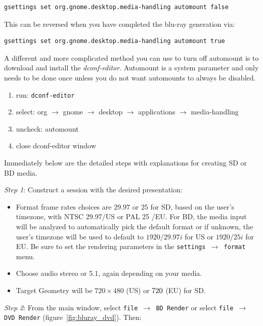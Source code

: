\begin{lstlisting}[language=bash,numbers=none]
gsettings set org.gnome.desktop.media-handling automount false
\end{lstlisting}

This can be reversed when you have completed the blu-ray generation via:

\begin{lstlisting}[language=bash,numbers=none]
gsettings set org.gnome.desktop.media-handling automount true
\end{lstlisting}

A different and more complicated method you can use to turn off automount is to download and install the \textit{dconf-editor}.  Automount is a system parameter and only needs to be done once unless you do not want automounts to always be disabled.

\begin{enumerate}
    \item run: \texttt{dconf-editor}
    \item select: org $\rightarrow$ gnome $\rightarrow$ desktop $\rightarrow$ applications $\rightarrow$ media-handling
    \item uncheck: automount
    \item close dconf-editor window
\end{enumerate}

Immediately below are the detailed steps with explanations for creating SD or BD media.

\textit{Step 1}: Construct a session with the desired presentation:

\begin{itemize}
    \item Format frame rates choices are $29.97$ or $25$ for SD, based on the user's timezone, with NTSC 29.97/US or PAL 25 /EU.  For BD, the media input will be analyzed to automatically pick the default format or if unknown, the user's timezone will be used to default to $1920/29.97i$ for US or $1920/25i$ for EU.  Be sure to set the rendering parameters in the \texttt{settings $\rightarrow$ format} menu.
    \item Choose audio stereo or 5.1, again depending on your media.
    \item Target Geometry will be $720\times480$ (US) or $720\time576$ (EU) for SD.
\end{itemize}

\textit{Step 2}: From the main window, select  \texttt{file $\rightarrow$ BD Render}   or    select  \texttt{file $\rightarrow$ DVD Render} (figure~\ref{fig:bluray_dvd}).  Then:

